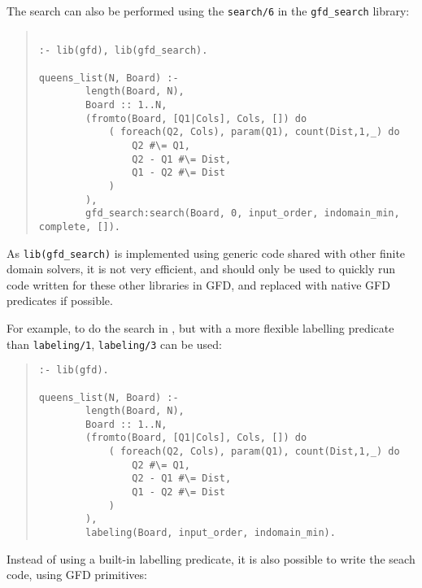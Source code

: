 The search can also be performed using the  \verb'search/6' in the 
\verb'gfd_search' library:

\begin{quote}
\begin{verbatim}

:- lib(gfd), lib(gfd_search).

queens_list(N, Board) :-
        length(Board, N),
        Board :: 1..N,
        (fromto(Board, [Q1|Cols], Cols, []) do
            ( foreach(Q2, Cols), param(Q1), count(Dist,1,_) do
                Q2 #\= Q1,
                Q2 - Q1 #\= Dist,
                Q1 - Q2 #\= Dist
            )
        ),
        gfd_search:search(Board, 0, input_order, indomain_min, complete, []).

\end{verbatim}
\end{quote}
As \verb'lib(gfd_search)' is implemented using generic code shared with other
finite domain solvers, it is not very efficient, and should only be used to
quickly run code written for these other libraries in GFD, and replaced with
native GFD predicates if possible.

For example, to do the search in \eclipse, but with a more flexible labelling
predicate than \verb'labeling/1', \verb'labeling/3' can be used:

\begin{quote}
\begin{verbatim}
:- lib(gfd).

queens_list(N, Board) :-
        length(Board, N),
        Board :: 1..N,
        (fromto(Board, [Q1|Cols], Cols, []) do
            ( foreach(Q2, Cols), param(Q1), count(Dist,1,_) do
                Q2 #\= Q1,
                Q2 - Q1 #\= Dist,
                Q1 - Q2 #\= Dist
            )
        ),
        labeling(Board, input_order, indomain_min).  

\end{verbatim}
\end{quote}

Instead of using a built-in labelling predicate, it is also possible to write
the seach code, using GFD primitives:


